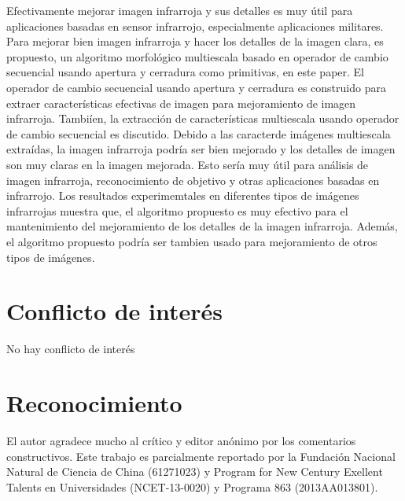 \documentclass[a4paper, 11 pt, conference]{ieeeconf}      %
\begin{document}
Efectivamente mejorar imagen infrarroja y sus detalles es muy \'util para aplicaciones basadas en sensor infrarrojo, especialmente aplicaciones militares. Para mejorar bien imagen infrarroja y hacer los detalles de la imagen clara, es propuesto, un algoritmo morfol\'ogico multiescala basado en operador de cambio secuencial usando apertura y cerradura como primitivas, en este paper. El operador de cambio secuencial usando apertura y cerradura es construido para extraer caracter\'isticas efectivas de imagen para mejoramiento de imagen infrarroja. Tambi\'ien, la extracci\'on de caracter\'isticas multiescala usando operador de cambio secuencial es discutido. Debido a las caracter\isticas de im\'agenes multiescala extra\'idas, la imagen infrarroja podr\'ia ser bien mejorado y los detalles de imagen son muy claras en la imagen mejorada. Esto ser\'ia muy \'util para an\'alisis de imagen infrarroja, reconocimiento de objetivo y otras aplicaciones basadas en infrarrojo. Los resultados experimemtales en diferentes tipos de im\'agenes infrarrojas muestra que, el algoritmo propuesto es muy efectivo para el mantenimiento del mejoramiento de los detalles de la imagen infrarroja. Adem\'as, el algoritmo propuesto podr\'ia ser tambien usado para mejoramiento de otros tipos de im\'agenes.

\section*{\textbf{Conflicto de inter\'es}}

No hay conflicto de inter\'es

\section*{\textbf{Reconocimiento}}

El autor agradece mucho al cr\'itico y editor an\'onimo por los comentarios constructivos. Este trabajo es parcialmente reportado por la Fundaci\'on Nacional Natural de Ciencia de China (61271023) y Program for New Century Exellent Talents en Universidades (NCET-13-0020) y Programa 863 (2013AA013801).
\end{document}
